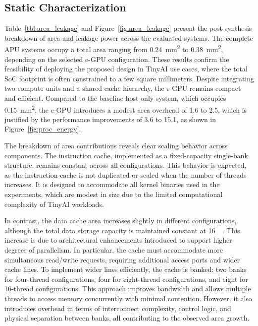         \subsection{Static Characterization}
        
            Table~\ref{tbl:area_leakage} and Figure~\ref{fig:area_leakage} present the post-synthesis breakdown of area and leakage power across the evaluated systems. The complete APU systems occupy a total area ranging from \SI{0.24}{\milli\meter\squared} to \SI{0.38}{\milli\meter\squared}, depending on the selected \mbox{e-GPU} configuration. These results confirm the feasibility of deploying the proposed design in TinyAI use cases, where the total SoC footprint is often constrained to a few square millimeters. Despite integrating two compute units and a shared cache hierarchy, the \mbox{e-GPU} remains compact and efficient. Compared to the baseline host-only system, which occupies \SI{0.15}{\milli\meter\squared}, the \mbox{e-GPU} introduces a modest area overhead of \SI{1.6}{\times} to \SI{2.5}{\times}, which is justified by the performance improvements of \SI{3.6}{\times} to \SI{15.1}{\times}, as shown in Figure~\ref{fig:proc_energy}.
        
            The breakdown of area contributions reveals clear scaling behavior across components. The instruction cache, implemented as a fixed-capacity single-bank structure, remains constant across all configurations. This behavior is expected, as the instruction cache is not duplicated or scaled when the number of threads increases. It is designed to accommodate all kernel binaries used in the experiments, which are modest in size due to the limited computational complexity of TinyAI workloads.
        
            In contrast, the data cache area increases slightly in different configurations, although the total data storage capacity is maintained constant at \SI{16}{\kibi\byte}. This increase is due to architectural enhancements introduced to support higher degrees of parallelism. In particular, the cache must accommodate more simultaneous read/write requests, requiring additional access ports and wider cache lines. To implement wider lines efficiently, the cache is banked: two banks for four-thread configurations, four for eight-thread configurations, and eight for 16-thread configurations. This approach improves bandwidth and allows multiple threads to access memory concurrently with minimal contention. However, it also introduces overhead in terms of interconnect complexity, control logic, and physical separation between banks, all contributing to the observed area growth.
        
